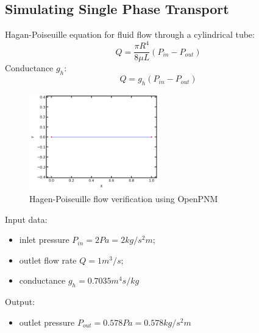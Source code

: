 \documentclass{article}
\begin{document}
\FloatBarrier  %
\subsection{Simulating Single Phase Transport}
Hagan-Poiseuille equation for fluid flow through a cylindrical tube:
\begin{equation}
    Q=\frac{\pi R^4}{8 \mu L} (P_{in}-P_{out})
\end{equation}
Conductance $g_h$:
\begin{equation}
    Q=g_h (P_{in}-P_{out})
\end{equation}
\begin{figure}[h]
    \centering
    \includegraphics[width=0.5\textwidth]{images/poiseuilleFlow.png}
    \caption{Hagen-Poiseuille flow verification using OpenPNM}
    \label{fig:poiseuille}
\end{figure}
Input data:
\begin{itemize}
    \item inlet pressure $P_{in} = 2 Pa = 2 kg/s^2m$;
    \item outlet flow rate $Q = 1 m^3/s$;
    \item conductance $g_h = 0.7035 m^4 s/kg$
\end{itemize}
Output:
\begin{itemize}
    \item outlet pressure $P_{out} = 0.578 Pa = 0.578 kg/s^2m$
\end{itemize}

\FloatBarrier  %
\end{document}
